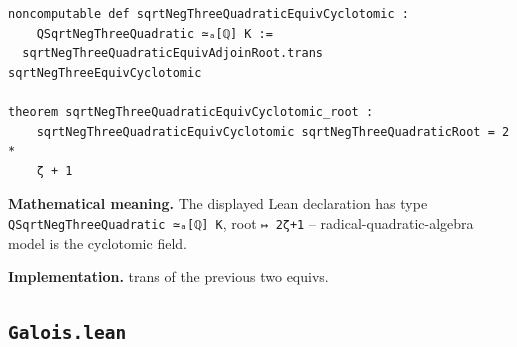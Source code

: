 \documentclass[UTF8,a4paper,11pt,fontset=fandol]{ctexart}
\theoremstyle{definition}
\begin{document}
\begin{verbatim}
noncomputable def sqrtNegThreeQuadraticEquivCyclotomic :
    QSqrtNegThreeQuadratic ≃ₐ[ℚ] K :=
  sqrtNegThreeQuadraticEquivAdjoinRoot.trans sqrtNegThreeEquivCyclotomic

theorem sqrtNegThreeQuadraticEquivCyclotomic_root :
    sqrtNegThreeQuadraticEquivCyclotomic sqrtNegThreeQuadraticRoot = 2 *
    ζ + 1
\end{verbatim}
\noindent\textbf{Mathematical meaning.} The displayed Lean declaration has type \texttt{QSqrtNegThreeQuadratic ≃ₐ[ℚ] K}, root \texttt{↦ 2ζ+1} -- radical-quadratic-algebra model is the cyclotomic field.\par
\noindent\textbf{Implementation.} trans of the previous two equivs.\par

\subsection{\texttt{Galois.lean}}
\end{document}
